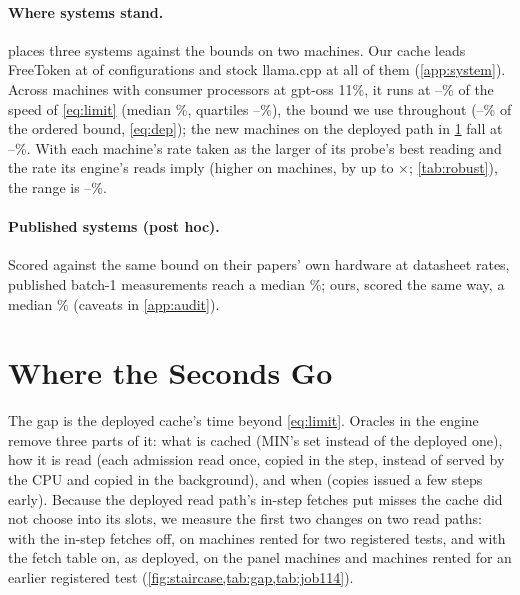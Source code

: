 \paragraph{Where systems stand.}  places three systems against the bounds on two machines. Our
cache leads FreeToken \citep{freetoken} at \bothLeadCells{} of \bothCells{} configurations and stock llama.cpp at all
of them (\cref{app:system}). Across \dcMachinesLow{} machines with consumer processors at gpt-oss 11\%, it runs at
\dcShareMinLowMin--\dcShareMinLowMax\% of the speed of \cref{eq:limit} (median \dcShareMinLowMed\%, quartiles \dcShareMinLowQOne--\dcShareMinLowQThree\%), the bound we use throughout
(\dcShareDepLowMin--\dcShareDepLowMax\% of the ordered bound, \cref{eq:dep}); the \olN{} new machines on the deployed path in
\cref{sec:gap} fall at \olShareLowMin--\olShareLowMax\%. With each machine's rate taken as the larger of its probe's
best reading and the rate its engine's reads imply (higher on \dcEnvRaisedLow{} machines, by up to
\dcEnvRaiseMaxLow$\times$; \cref{tab:robust}), the range is \dcShareEnvLowMin--\dcShareEnvLowMax\%.

\paragraph{Published systems (post hoc).} Scored against the same bound on their papers' own hardware at datasheet
rates, \audInclassN{} published batch-1 measurements reach a median \audInclassMed\%; ours, scored the same way, a median
\audOursMed\% (caveats in \cref{app:audit}).



\section{Where the Seconds Go}\label{sec:gap}
The gap is the deployed cache's time beyond \cref{eq:limit}. Oracles in the engine remove three parts of it: what is
cached (MIN's set instead of the deployed one), how it is read (each admission read once, copied in the step, instead
of served by the CPU and copied in the background), and when (copies issued a few steps early). Because the deployed
read path's in-step fetches put misses the cache did not choose into its slots, we measure the first two changes on two
read paths: with the in-step fetches off, on \dpN{} machines rented for two registered tests, and with the fetch table
on, as deployed, on the \dmMachines{} panel machines and \olN{} machines rented for an earlier registered test
(\cref{fig:staircase,tab:gap,tab:job114}).

